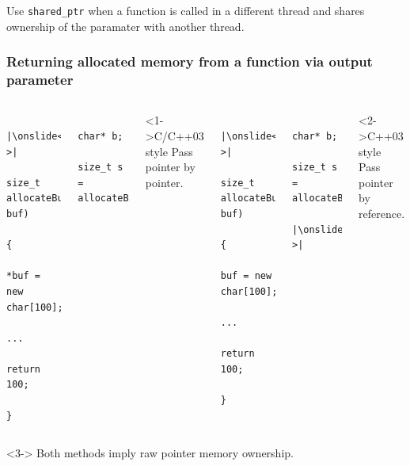 \documentclass{beamer}
\begin{document}
\begin{frame}
    Use \texttt{shared\_ptr} when a function is called in a different thread and shares ownership
    of the paramater with another thread.
\end{frame}


\begin{frame}[fragile,t]
\frametitle{Returning allocated memory from a function via output parameter}
	\begin{columns}[T]
		\begin{lstlisting}
			|\onslide<1->|
			size_t allocateBuffer(char** buf)
			{
				*buf = new char[100];
				...
				return 100;
			}
		\end{lstlisting}
        \hrulefill
		\begin{lstlisting}
			char* b;
			size_t s = allocateBuffer(&b);
		\end{lstlisting}
        \hrulefill
		\begin{block}<1->{C/C++03 style}
			Pass pointer by pointer.
		\end{block}
		\begin{lstlisting}
			|\onslide<2->|
			size_t allocateBuffer(char*& buf)
			{
				buf = new char[100];
				...
				return 100;
			}
		\end{lstlisting}
        \hrulefill
		\begin{lstlisting}
			char* b;
			size_t s = allocateBuffer(b);
			|\onslide<1->|
		\end{lstlisting}
        \hrulefill
		\begin{block}<2->{C++03 style}
			Pass pointer by reference.
		\end{block}
	\end{columns}
	\begin{alertblock}<3->{}
		Both methods imply raw pointer memory ownership.	
	\end{alertblock}
\end{frame}
\end{document}
